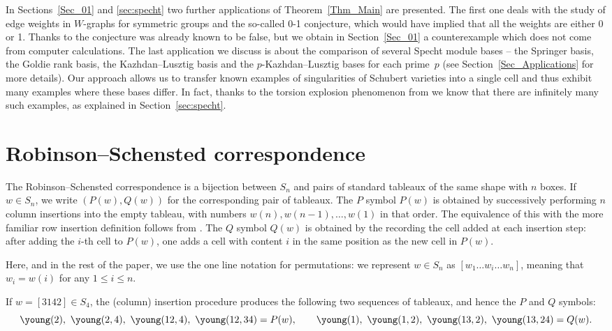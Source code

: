 \documentclass[pdftex]{sigma}
\numberwithin{equation}{section}
\begin{document}
In Sections~\ref{Sec_01} and \ref{sec:specht} two further applications of Theorem~\ref{Thm_Main} are presented. The first one deals with the study of edge weights in $W$-graphs for symmetric groups and the so-called 0-1 conjecture, which would have implied that all the weights are either 0 or 1. Thanks to \cite{mclarnanwarrington} the conjecture was already known to be false, but we obtain in Section~\ref{Sec_01} a counterexample which does not come from computer calculations. The last application we discuss is about the comparison of several Specht module bases -- the Springer basis, the Goldie rank basis, the Kazhdan--Lusztig basis and the $p$-Kazhdan--Lusztig bases for each prime~$p$ (see Section~\ref{Sec_Applications} for more details). Our approach allows us to transfer known examples of singularities of Schubert varieties into a single cell and thus exhibit many examples where these bases differ. In fact, thanks to the torsion explosion phenomenon from \cite{explosion} we know that there are infinitely many such examples, as explained in Section~\ref{sec:specht}.

\section{Robinson--Schensted correspondence}\label{sec:combinatorics}

The Robinson--Schensted correspondence is a bijection between $S_n$ and pairs of standard tab\-leaux of the same shape with $n$ boxes. If $w\in S_n$, we write $(P(w),Q(w))$ for the corresponding pair of tableaux. The $P$ symbol $P(w)$ is obtained by successively performing $n$ column insertions into the empty tableau, with numbers $w(n),w(n-1),\dots,w(1)$ in that order. The equivalence of this with the more familiar row insertion definition follows from \cite[Lemma 7.23.15]{stanley}. The $Q$ symbol $Q(w)$ is obtained by the recording the cell added at each insertion step: after adding the $i$-th cell to $P(w)$, one adds a cell with content $i$ in the same position as the new cell in $P(w)$.

Here, and in the rest of the paper, we use the one line notation for permutations: we represent $w\in S_n$ as $[w_1\dots w_i\dots w_n]$, meaning that $w_i=w(i)$ for any $1\leq i\leq n$.
\begin{Example}\label{exple:PQsymbols}If $w=[3142]\in S_4$, the (column) insertion procedure produces the following two sequences of tableaux, and hence the $P$ and $Q$ symbols:
\[
\young(2), \ \young(2,4), \ \young(12,4), \ \young(12,34)=P(w),
\qquad
\young(1), \ \young(1,2), \ \young(13,2), \ \young(13,24)=Q(w).
\]
\end{Example}
\end{document}
